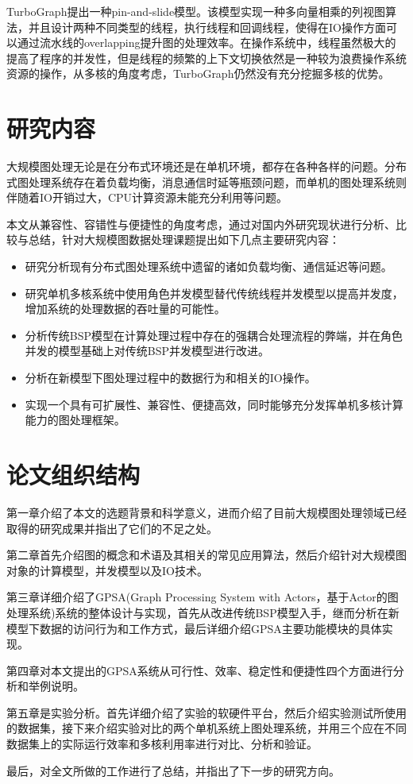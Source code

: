 TurboGraph\cite{han2013turbograph}提出一种pin-and-slide模型。该模型实现一种多向量相乘的列视图算法，并且设计两种不同类型的线程，执行线程和回调线程，使得在IO操作方面可以通过流水线的overlapping提升图的处理效率。在操作系统中，线程虽然极大的提高了程序的并发性，但是线程的频繁的上下文切换依然是一种较为浪费操作系统资源的操作，从多核的角度考虑，TurboGraph仍然没有充分挖掘多核的优势。



\section{研究内容}



大规模图处理无论是在分布式环境还是在单机环境，都存在各种各样的问题。分布式图处理系统存在着负载均衡，消息通信时延等瓶颈问题，而单机的图处理系统则伴随着IO开销过大，CPU计算资源未能充分利用等问题。

本文从兼容性、容错性与便捷性的角度考虑，通过对国内外研究现状进行分析、比较与总结，针对大规模图数据处理课题提出如下几点主要研究内容：
\begin{itemize}
\item 研究分析现有分布式图处理系统中遗留的诸如负载均衡、通信延迟等问题。
\item 研究单机多核系统中使用角色并发模型替代传统线程并发模型以提高并发度，增加系统的处理数据的吞吐量的可能性。
\item 分析传统BSP模型在计算处理过程中存在的强耦合处理流程的弊端，并在角色并发的模型基础上对传统BSP并发模型进行改进。
\item 分析在新模型下图处理过程中的数据行为和相关的IO操作。
\item 实现一个具有可扩展性、兼容性、便捷高效，同时能够充分发挥单机多核计算能力的图处理框架。
\end{itemize}

\section{论文组织结构}

第一章介绍了本文的选题背景和科学意义，进而介绍了目前大规模图处理领域已经取得的研究成果并指出了它们的不足之处。

第二章首先介绍图的概念和术语及其相关的常见应用算法，然后介绍针对大规模图对象的计算模型，并发模型以及IO技术。

第三章详细介绍了GPSA(Graph Processing System with Actors，基于Actor的图处理系统)系统的整体设计与实现，首先从改进传统BSP模型入手，继而分析在新模型下数据的访问行为和工作方式，最后详细介绍GPSA主要功能模块的具体实现。

第四章对本文提出的GPSA系统从可行性、效率、稳定性和便捷性四个方面进行分析和举例说明。

第五章是实验分析。首先详细介绍了实验的软硬件平台，然后介绍实验测试所使用的数据集，接下来介绍实验对比的两个单机系统上图处理系统，并用三个应在不同数据集上的实际运行效率和多核利用率进行对比、分析和验证。

最后，对全文所做的工作进行了总结，并指出了下一步的研究方向。